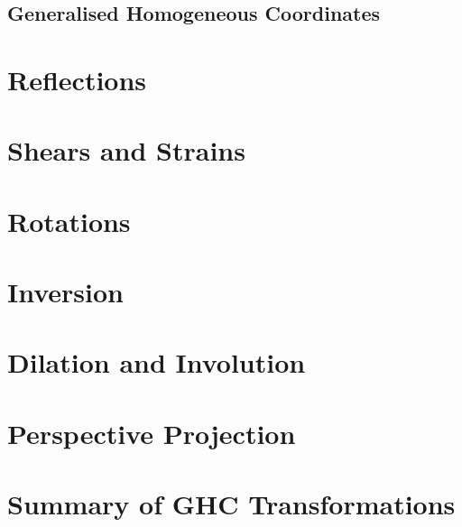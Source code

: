 \documentclass[a4paper]{book}
\numberwithin{equation}{chapter}
\begin{document}
\subsection{Generalised Homogeneous Coordinates}




    \section{Reflections}
    \section{Shears and Strains}
    \section{Rotations}
    \section{Inversion}
    \section{Dilation and Involution}
    \section{Perspective Projection}
    \section{Summary of GHC Transformations}
\end{document}
